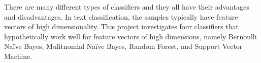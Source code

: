 There are many different types of classifiers and they all have their advantages and disadvantages. In text classification, the samples typically have feature vectors of high dimensionality. This project investigates four classifiers that hypothetically work well for feature vectors of high dimensions, namely Bernoulli Naïve Bayes, Mulitnomial Naïve Bayes, Random Forest, and Support Vector Machine. 